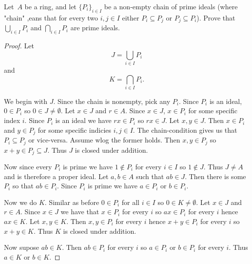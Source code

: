 \begin{prob}
    Let $A$ be a ring, and let $\{P_i\}_{i\in I}$ be a 
    non-empty chain of prime ideals (where "chain" ,eans 
    that for every two $i,j \in I$ either $P_i \subseteq P_j$ 
    or $P_j \subseteq P_i$). Prove that 
    $\bigcup_{i\in I}P_i$ and $\bigcap_{i\in I}P_i$
    are prime ideals. 
\end{prob}
\begin{proof}
    Let 
    \[
        J = \bigcup_{i \in I} P_i
    \]
    and 
    \[
        K = \bigcap_{i \in I} P_i.
    \]

    We begin with $J$. 
    Since the chain is nonempty, pick any $P_i$. Since 
    $P_i$ is an ideal, $0 \in P_i$ so $0 \in J \neq \emptyset$. 
    Let $x \in J$ and $r \in A$. Since $x \in J$, 
    $x \in P_i$ for some specific index $i$. Since $P_i$ is 
    an ideal we have $rx \in P_i$ so $rx \in J$. 
    Let $x,y \in J$. Then $x \in P_i$ and $y \in P_j$ for 
    some specific indicies $i,j\in I$. The chain-condition 
    gives us that $P_i \subseteq P_j$ or vice-versa. Assume 
    wlog the former holds. Then 
    $x,y \in P_j$ so $x+y \in P_j \subseteq J$. Thus 
    $J$ is closed under addition. 

    Now since every $P_i$ is prime we have $1 \not\in P_i$ for 
    every $i \in I$ so $1 \not \in J$. Thus $J \neq A$ and is 
    therefore a proper ideal. Let $a,b \in A$ such 
    that $ab \in J$. Then there is some $P_i$ so that 
    $ab \in P_i$. Since $P_i$ is prime we have 
    $a \in P_i$ or $b \in P_i$. 

    Now we do $K$. 
    Similar as before $0 \in P_i$ for all $i \in I$ so 
    $0 \in K \neq \emptyset$. 
    Let $x \in J$ and $r \in A$. Since $x \in J$ we have that 
    $x \in P_i$ for every $i$ so $ax \in P_i$ for every 
    $i$ hence $ax \in K$. Let $x,y \in K$. Then 
    $x,y \in P_i$ for every $i$ hence 
    $x +y \in P_i$ for every $i$ so $x+ y \in K$. 
    Thus $K$ is closed under addition. 

    Now supose $ab \in K$. Then $ab \in P_i$ for every 
    $i$ so $a \in P_i$ or $b \in P_i$ for every $i$. 
    Thus $a \in K$ or $b \in K$. 
\end{proof}

